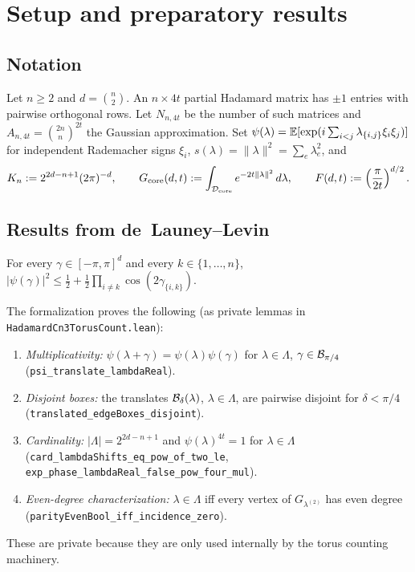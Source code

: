 \chapter{Setup and preparatory results}\label{chap:setup}

\section{Notation}

Let $n\ge 2$ and $d=\binom{n}{2}$.
An $n\times 4t$ partial Hadamard matrix has $\pm1$ entries with
pairwise orthogonal rows.
Let $N_{n,4t}$ be the number of such matrices and
$A_{n,4t}=\binom{2n}{n}^{2t}$ the Gaussian approximation.
Set $\psi(\lambda)=\mathbb{E}[\exp(i\sum_{i<j}\lambda_{\{i,j\}}\xi_i\xi_j)]$
for independent Rademacher signs $\xi_i$,
$s(\lambda)=\|\lambda\|^2=\sum_e\lambda_e^2$, and
\[
  K_n:=2^{2d-n+1}(2\pi)^{-d},
  \qquad
  G_{\mathrm{core}}(d,t):=\int_{\mathcal{D}_\mathrm{core}}e^{-2t\|\lambda\|^2}\,d\lambda,
  \qquad
  F(d,t):=\left(\frac{\pi}{2t}\right)^{d/2}.
\]

\section{Results from de~Launey--Levin}

\begin{lemma}\label{fact:psi-sq}
\leanok
For every $\gamma\in[-\pi,\pi]^d$ and every $k\in\{1,\dots,n\}$,
$|\psi(\gamma)|^2\le \frac12+\frac12\prod_{i\ne k}\cos(2\gamma_{\{i,k\}})$.
\end{lemma}

\begin{lemma}\label{fact:lambda-facts}
\leanok
The formalization proves the following (as private lemmas in
\texttt{HadamardCn3TorusCount.lean}):
\begin{enumerate}
\item \emph{Multiplicativity:}
$\psi(\lambda+\gamma)=\psi(\lambda)\psi(\gamma)$ for $\lambda\in\Lambda$,
$\gamma\in\mathcal{B}_{\pi/4}$
\textup{(\texttt{psi\_translate\_lambdaReal})}.
\item \emph{Disjoint boxes:}
the translates $\mathcal{B}_\delta(\lambda)$, $\lambda\in\Lambda$, are
pairwise disjoint for $\delta<\pi/4$
\textup{(\texttt{translated\_edgeBoxes\_disjoint})}.
\item \emph{Cardinality:}
$|\Lambda|=2^{2d-n+1}$ and $\psi(\lambda)^{4t}=1$ for $\lambda\in\Lambda$
\textup{(\texttt{card\_lambdaShifts\_eq\_pow\_of\_two\_le},
\texttt{exp\_phase\_lambdaReal\_false\_pow\_four\_mul})}.
\item \emph{Even-degree characterization:}
$\lambda\in\Lambda$ iff every vertex of $G_{\lambda^{(2)}}$ has
even degree
\textup{(\texttt{parityEvenBool\_iff\_incidence\_zero})}.
\end{enumerate}
These are private because they are only used internally
by the torus counting machinery.
\end{lemma}

